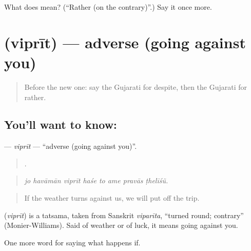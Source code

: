 \begin{tcolorbox}[breakable,colback=teal!4,colframe=teal!35!black,title={Before you move on}]
What does  mean? (\textquotedblleft{}Rather (on the contrary)\textquotedblright{}.) Say it once more.
\end{tcolorbox}
\section[\texorpdfstring{\gu{વિપરીત} (viprīt)}{વિપરીત (viprīt)}]{ (viprīt) — adverse (going against you)}

\label{lesson:GU-C547-viprit}



\begin{quote}
Before the new one: say the Gujarati for despite, then the Gujarati for rather.
\end{quote}

\subsection*{You'll want to know: }
\textbf{} — \emph{viprīt} — \textquotedblleft{}adverse (going against you)\textquotedblright{}.

\begin{quote}
       .
\end{quote}

\begin{quote}
\emph{jo havāmān viprīt haśe to ame pravās ṭhelīśũ.}
\end{quote}

\begin{quote}
If the weather turns against us, we will put off the trip.
\end{quote}

\begin{cousinweb}
\textbf{} (\emph{viprīt}) is a tatsama, taken from Sanskrit \emph{viparīta}, \textquotedblleft{}turned round; contrary\textquotedblright{} (Monier-Williams). Said of weather or of luck, it means going against you.
\end{cousinweb}

\begin{grammarlens}[title={What you've built}]
One more word for saying what happens if.
\end{grammarlens}

